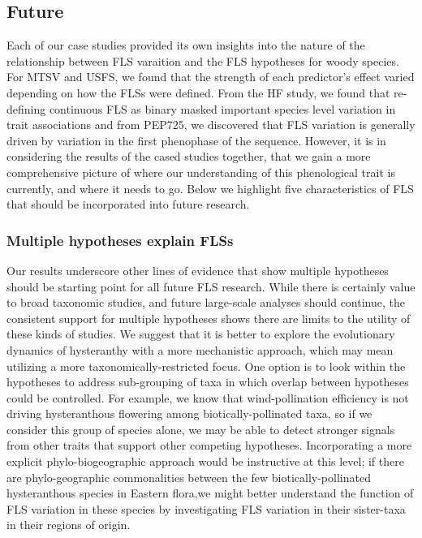 \documentclass[12pt]{article}
\begin{document}
\subsection*{Future}
\indent\indent Each of our case studies provided its own insights into the nature of the relationship between FLS varaition and the FLS hypotheses for woody species. For MTSV and USFS, we found that the strength of each predictor's effect varied depending on how the FLSs were defined. From the HF study, we found that re-defining  continuous FLS as binary masked important species level variation in trait associations and from PEP725, we discovered that FLS variation is generally driven by variation in the first phenophase of the sequence. However, it is in considering the results of the cased studies together, that we gain a more comprehensive picture of where our understanding of this phenological trait is currently, and where it needs to go. Below we highlight five characteristics of FLS that should be incorporated into future research.
\subsubsection*{Multiple hypotheses explain FLSs}

\indent\indent Our results underscore other lines of evidence that show multiple hypotheses should be starting point for all future FLS research. While there is certainly value to broad taxonomic studies, and future large-scale analyses should continue, the consistent support for multiple hypotheses shows there are limits to the utility of these kinds of studies. We suggest that it is better to explore the evolutionary dynamics of hysteranthy with a more mechanistic approach, which may mean utilizing a more taxonomically-restricted focus. One option is to look within the hypotheses to address sub-grouping of taxa in which overlap between hypotheses could be controlled. For example, we know that wind-pollination efficiency is not driving hysteranthous flowering among biotically-pollinated taxa, so if we consider this group of species alone, we may be able to detect stronger signals from other traits that support other competing hypotheses. Incorporating a more explicit phylo-biogeographic approach would be instructive at this level; if there are phylo-geographic commonalities between the few biotically-pollinated hysteranthous species in Eastern flora,we might better understand the function of FLS variation in these species by investigating FLS variation in their sister-taxa in their regions of origin.\\
\end{document}
